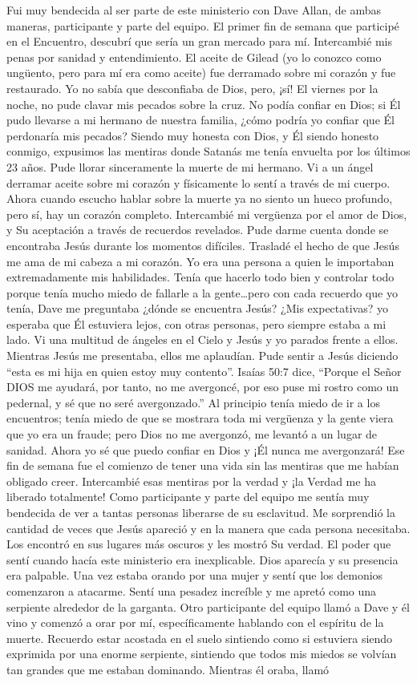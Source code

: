 \documentclass[twoside, 12pt]{book}
\begin{document}
Fui muy bendecida al ser parte de este ministerio con Dave Allan, de ambas maneras, participante y parte del equipo. El primer fin de semana que participé en el Encuentro, descubrí que sería un gran mercado para mí. Intercambié mis penas por sanidad y entendimiento.  El aceite de Gilead (yo lo conozco como ungüento, pero para mí era como aceite) fue derramado sobre mi corazón y fue restaurado. Yo no sabía que desconfiaba de Dios, pero, ¡sí! El viernes por la noche, no pude clavar mis pecados sobre la cruz.  No podía confiar en Dios; si Él pudo llevarse a mi hermano de nuestra familia, ¿cómo podría yo confiar que Él perdonaría mis pecados? Siendo muy honesta con Dios, y Él siendo honesto conmigo, expusimos las mentiras donde Satanás me tenía envuelta por los últimos 23 años.  Pude llorar sinceramente la muerte de mi hermano. Vi a un ángel derramar aceite sobre mi corazón y físicamente lo sentí a través de mi cuerpo. Ahora cuando escucho hablar sobre la muerte ya no siento un hueco profundo, pero sí, hay un corazón completo.  Intercambié mi vergüenza por el amor de Dios, y Su aceptación a través de recuerdos revelados. Pude darme cuenta donde se encontraba Jesús durante los momentos difíciles. Trasladé el hecho de que Jesús me ama de mi cabeza a mi corazón. Yo era una persona a quien le importaban extremadamente mis habilidades. Tenía que hacerlo todo bien y controlar todo porque tenía mucho miedo de fallarle a la gente…pero con cada recuerdo que yo tenía, Dave me preguntaba ¿dónde se encuentra Jesús? ¿Mis expectativas? yo esperaba que Él estuviera lejos, con otras personas, pero siempre estaba a mi lado.  Vi una multitud de ángeles en el Cielo y Jesús y yo parados frente a ellos.  Mientras Jesús me presentaba, ellos me aplaudían.  Pude sentir a Jesús diciendo “esta es mi hija en quien estoy muy contento”.  Isaías 50:7 dice, “Porque el Señor DIOS me ayudará, por tanto, no me avergoncé, por eso puse mi rostro como un pedernal, y sé que no seré avergonzado.”  Al principio tenía miedo de ir a los encuentros; tenía miedo de que se mostrara toda mi vergüenza y la gente viera que yo era un fraude; pero Dios no me avergonzó, me levantó a un lugar de sanidad.  Ahora yo sé que puedo confiar en Dios y ¡Él nunca me avergonzará!  Ese fin de semana fue el comienzo de tener una vida sin las mentiras que me habían obligado creer. Intercambié esas mentiras por la verdad y ¡la Verdad me ha liberado totalmente!  Como participante y parte del equipo me sentía muy bendecida de ver a tantas personas liberarse de su esclavitud. Me sorprendió la cantidad de veces que Jesús apareció y en la manera que cada persona necesitaba.  Los encontró en sus lugares más oscuros y les mostró Su verdad. El poder que sentí cuando hacía este ministerio era inexplicable. Dios aparecía y su presencia era palpable. Una vez estaba orando por una mujer y sentí que los demonios comenzaron a atacarme. Sentí una pesadez increíble y me apretó como una serpiente alrededor de la garganta. Otro participante del equipo llamó a Dave y él vino y comenzó a orar por mí, específicamente hablando con el espíritu de la muerte. Recuerdo estar acostada en el suelo sintiendo como si estuviera siendo exprimida por una enorme serpiente, sintiendo que todos mis miedos se volvían tan grandes que me estaban dominando. Mientras él oraba, llamó 
\end{document}
